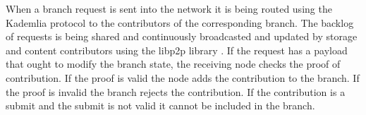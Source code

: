 \documentclass[14pt]{article}
\begin{document}
When a branch request is sent into the network it is being routed using the Kademlia protocol to the contributors of the corresponding branch. The backlog of requests is being shared and continuously broadcasted and updated by storage and content contributors using the libp2p library \cite{}. If the request has a payload that ought to modify the branch state, the receiving node checks the proof of contribution. If the proof is valid the node adds the contribution to the branch. If the proof is invalid the branch rejects the contribution. If the contribution is a submit and the submit is not valid it cannot be included in the branch. 














% 
\end{document}
